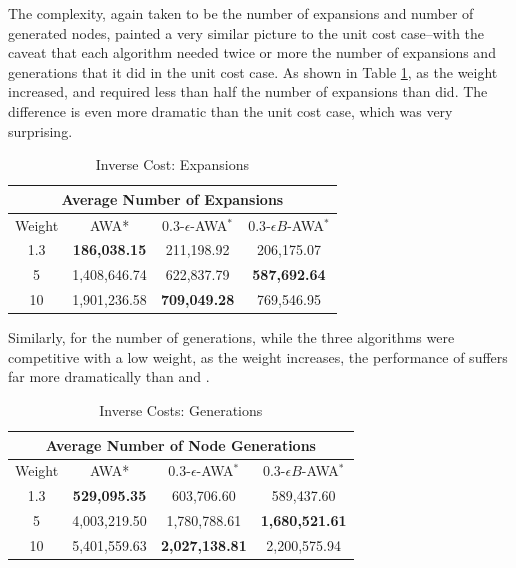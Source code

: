 The complexity, again taken to be the number of expansions and number of generated nodes, painted a very similar picture to the unit cost case--with the caveat that each algorithm needed twice or more the number of expansions and generations that it did in the unit cost case. As shown in Table \ref{tab:inv-avg-exp}, as the weight increased, \eawa and \ebawa required less than half the number of expansions than \awa did. The difference is even more dramatic than the unit cost case, which was very surprising.

\begin{table}
\def\arraystretch{1.3}
\begin{tabular}{ |c||c|c|c|  }
    \hline
    \multicolumn{4}{|c|}{Average Number of Expansions} \\
    \hline
    Weight& AWA* & $0.3$-$\epsilon$-AWA$^*$ & $0.3$-$\epsilon B$-AWA$^*$\\
    \hline
    1.3 & \textbf{186,038.15} & 211,198.92 & 206,175.07 \\
    \hline
    5 & 1,408,646.74 & 622,837.79 & \textbf{587,692.64} \\
    \hline
    10& 1,901,236.58 & \textbf{709,049.28} & 769,546.95 \\
    \hline
\end{tabular}
\caption{Inverse Cost: Expansions}\label{tab:inv-avg-exp}
\end{table}

Similarly, for the number of generations, while the three algorithms were competitive with a low weight, as the weight increases, the performance of \awa suffers far more dramatically than \eawa and \ebawa. 

\begin{table}
\def\arraystretch{1.3}
\begin{tabular}{ |c||c|c|c|  }
    \hline
    \multicolumn{4}{|c|}{Average Number of Node Generations} \\
    \hline
    Weight& AWA* & $0.3$-$\epsilon$-AWA$^*$ & $0.3$-$\epsilon B$-AWA$^*$\\
    \hline
    1.3 & \textbf{529,095.35} & 603,706.60 & 589,437.60 \\
    \hline
    5 & 4,003,219.50 & 1,780,788.61 & \textbf{1,680,521.61} \\
    \hline
    10& 5,401,559.63 & \textbf{2,027,138.81} & 2,200,575.94 \\
    \hline
\end{tabular}
\caption{Inverse Costs: Generations}\label{tab:inv-avg-gen}
\end{table}

